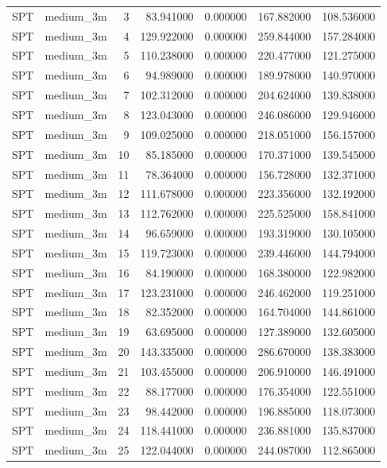 \begin{tabular}{llrrrrr}
SPT & medium_3m & 3 & 83.941000 & 0.000000 & 167.882000 & 108.536000 \\
SPT & medium_3m & 4 & 129.922000 & 0.000000 & 259.844000 & 157.284000 \\
SPT & medium_3m & 5 & 110.238000 & 0.000000 & 220.477000 & 121.275000 \\
SPT & medium_3m & 6 & 94.989000 & 0.000000 & 189.978000 & 140.970000 \\
SPT & medium_3m & 7 & 102.312000 & 0.000000 & 204.624000 & 139.838000 \\
SPT & medium_3m & 8 & 123.043000 & 0.000000 & 246.086000 & 129.946000 \\
SPT & medium_3m & 9 & 109.025000 & 0.000000 & 218.051000 & 156.157000 \\
SPT & medium_3m & 10 & 85.185000 & 0.000000 & 170.371000 & 139.545000 \\
SPT & medium_3m & 11 & 78.364000 & 0.000000 & 156.728000 & 132.371000 \\
SPT & medium_3m & 12 & 111.678000 & 0.000000 & 223.356000 & 132.192000 \\
SPT & medium_3m & 13 & 112.762000 & 0.000000 & 225.525000 & 158.841000 \\
SPT & medium_3m & 14 & 96.659000 & 0.000000 & 193.319000 & 130.105000 \\
SPT & medium_3m & 15 & 119.723000 & 0.000000 & 239.446000 & 144.794000 \\
SPT & medium_3m & 16 & 84.190000 & 0.000000 & 168.380000 & 122.982000 \\
SPT & medium_3m & 17 & 123.231000 & 0.000000 & 246.462000 & 119.251000 \\
SPT & medium_3m & 18 & 82.352000 & 0.000000 & 164.704000 & 144.861000 \\
SPT & medium_3m & 19 & 63.695000 & 0.000000 & 127.389000 & 132.605000 \\
SPT & medium_3m & 20 & 143.335000 & 0.000000 & 286.670000 & 138.383000 \\
SPT & medium_3m & 21 & 103.455000 & 0.000000 & 206.910000 & 146.491000 \\
SPT & medium_3m & 22 & 88.177000 & 0.000000 & 176.354000 & 122.551000 \\
SPT & medium_3m & 23 & 98.442000 & 0.000000 & 196.885000 & 118.073000 \\
SPT & medium_3m & 24 & 118.441000 & 0.000000 & 236.881000 & 135.837000 \\
SPT & medium_3m & 25 & 122.044000 & 0.000000 & 244.087000 & 112.865000 \\

\end{tabular}
